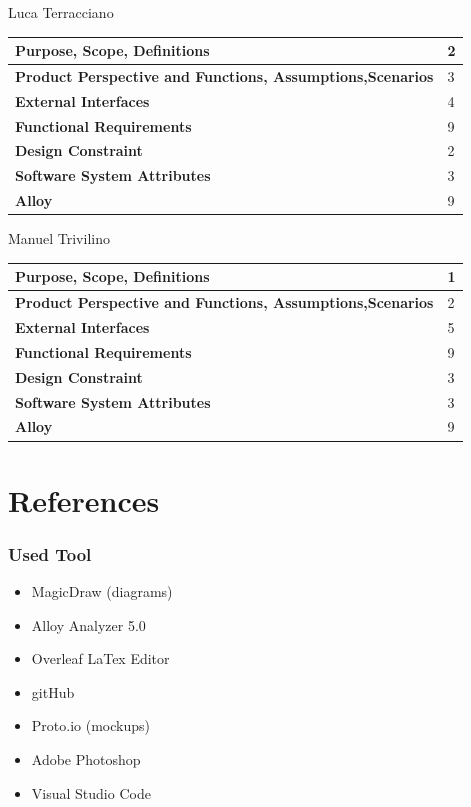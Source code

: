 \documentclass[a4paper]{article}
\begin{document}
\noindent  Luca Terracciano
    
        \begin{center}
    \begin{tabular}{|l | l |}
        \hline \bf{Purpose, Scope, Definitions} & 2 \\ \hline
        \bf{Product Perspective and Functions, Assumptions,Scenarios}  & 3 \\ \hline
        \bf{External Interfaces} & 4 \\ \hline
        \bf{Functional Requirements} & 9 \\ \hline
        \bf{Design Constraint} & 2\\ \hline
        \bf{Software System Attributes} & 3 \\ \hline
        \bf{Alloy} & 9 \\ \hline
    \end{tabular}
\end{center}

    \noindent Manuel Trivilino
    
        \begin{center}
    \begin{tabular}{|l | l |}
        \hline \bf{Purpose, Scope, Definitions} & 1 \\ \hline
        \bf{Product Perspective and Functions, Assumptions,Scenarios}  & 2 \\ \hline
        \bf{External Interfaces} & 5 \\ \hline
        \bf{Functional Requirements} & 9 \\ \hline
        \bf{Design Constraint} & 3 \\ \hline
        \bf{Software System Attributes} & 3 \\ \hline
        \bf{Alloy} & 9 \\ \hline
    \end{tabular}
\end{center}
    
    
    \section{References}

    \subsubsection{Used Tool}

    \begin{itemize}
        \item MagicDraw (diagrams)
        \item Alloy Analyzer 5.0
        \item Overleaf LaTex Editor
        \item gitHub
        \item Proto.io (mockups)
        \item Adobe Photoshop
        \item Visual Studio Code
        
    \end{itemize}
    
\end{document}
